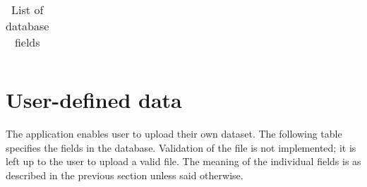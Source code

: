 \begin{longtable}{| p{} | p{} |}
\caption{List of database fields}
\end{longtable}

\section{User-defined data}

The application enables user to upload their own dataset. The following table specifies the fields in the database. Validation of the
file is not implemented; it is left up to the user to upload a valid file. The meaning of the individual
fields is as described in the previous section unless said otherwise.

\begin{longtable}{| p{} | p{} | p{} | p{} |} 


\end{longtable}
